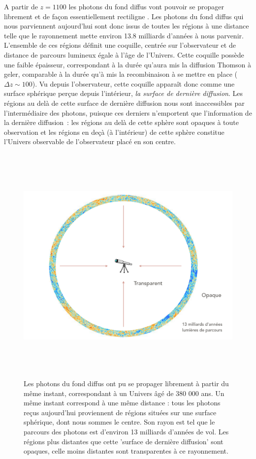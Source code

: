 A partir de $z=1100$ les photons du fond diffus vont pouvoir se propager librement et de façon essentiellement rectiligne . Les photons du fond diffus qui nous parviennent aujourd'hui sont donc issus de toutes les régions à une distance telle que le rayonnement mette environ 13.8 milliards d'années à nous parvenir. L'ensemble de ces régions définit une coquille, centrée sur l'observateur et de distance de parcours lumineux égale à l'âge de l'Univers. Cette coquille possède une faible épaisseur, correspondant à la durée qu'aura mis la diffusion Thomson à geler, comparable à la durée qu'à mis la recombinaison à se mettre en place ($\Delta z\sim 100$). Vu depuis l'observateur, cette coquille apparaît donc comme une surface sphérique perçue depuis l'intérieur, \textit{la surface de dernière diffusion}. Les régions au delà de cette surface de dernière diffusion nous sont inaccessibles par l'intermédiaire des photons, puisque ces derniers n'emportent que l'information de la dernière diffusion~: les régions au delà de cette sphère sont opaques à toute observation et les régions en deçà (à l'intérieur) de cette sphère constitue l'Univers observable de l'observateur placé en son centre.

\begin{figure}[htbp]
	\centering
		\includegraphics[height=12cm]{figs/LSS.png}
	\caption[L'Univers devient transparent au CMB]{Les photons du fond diffus ont pu se propager librement à partir du même instant, correspondant à un Univers âgé de 380 000 ans. Un même instant correspond à une même distance : tous les photons reçus aujourd'hui proviennent de régions situées sur une surface sphérique, dont nous sommes le centre. Son rayon est tel que le parcours des photons est d'environ 13 milliards d'années de vol. Les régions plus distantes que cette 'surface de dernière diffusion' sont opaques, celle moins distantes sont transparentes à ce rayonnement.}
	\label{f:LSS}
\end{figure}

